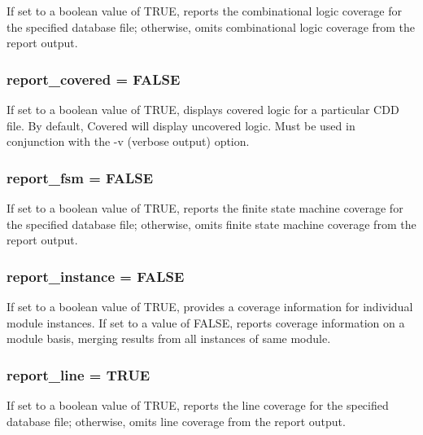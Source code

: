 If set to a boolean value of TRUE, reports the combinational logic coverage for the specified database file; otherwise, omits combinational logic coverage from the report output. 
\subsubsection{ report\_\-covered = FALSE}\label{report_8c_a6}


If set to a boolean value of TRUE, displays covered logic for a particular CDD file. By default, Covered will display uncovered logic. Must be used in conjunction with the -v (verbose output) option. 
\subsubsection{ report\_\-fsm = FALSE}\label{report_8c_a4}


If set to a boolean value of TRUE, reports the finite state machine coverage for the specified database file; otherwise, omits finite state machine coverage from the report output. 
\subsubsection{ report\_\-instance = FALSE}\label{report_8c_a5}


If set to a boolean value of TRUE, provides a coverage information for individual module instances. If set to a value of FALSE, reports coverage information on a module basis, merging results from all instances of same module. 
\subsubsection{ report\_\-line = TRUE}\label{report_8c_a1}


If set to a boolean value of TRUE, reports the line coverage for the specified database file; otherwise, omits line coverage from the report output. 
